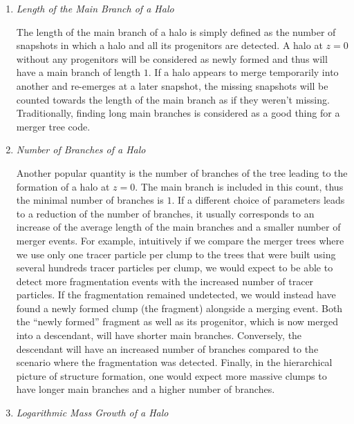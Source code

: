 \begin{enumerate}
  \setlength\itemsep{1em}
\item \emph{Length of the Main Branch of a Halo}
  
  The length of the main branch of a halo is simply defined as the
  number of snapshots in which a halo and all its progenitors are
  detected.  A halo at $z=0$ without any progenitors will be
  considered as newly formed and thus will have a main branch of
  length $1$.  If a halo appears to merge temporarily into another and
  re-emerges at a later snapshot, the missing snapshots will be
  counted towards the length of the main branch as if they weren't
  missing. Traditionally, finding long main branches is considered
  as a good thing for a merger tree code.
  
\item \emph{Number of Branches of a Halo}
  
  Another popular quantity is the number of branches of the tree
  leading to the formation of a halo at $z=0$.  The main branch is
  included in this count, thus the minimal number of branches is
  $1$. If a different choice of parameters leads to a reduction of the
  number of branches, it usually corresponds to an increase of the
  average length of the main branches and a smaller number of merger
  events. For example, intuitively if we compare the merger trees where
  we use only one tracer particle per clump to the trees that were built 
  using several hundreds tracer particles per clump, we would expect to 
  be able to detect more fragmentation events with the increased number of 
  tracer particles. If the fragmentation remained undetected, we would 
  instead have found a newly formed clump (the fragment) alongside a 
  merging event. Both the ``newly formed'' fragment as well as its
  progenitor, which is now merged into a descendant, will have shorter
  main branches. Conversely, the descendant will have an increased 
  number of branches compared to the scenario where the fragmentation
  was detected.
  Finally, in the hierarchical picture of structure formation, one
  would expect more massive clumps to have longer main branches and a
  higher number of branches.
  
\item \emph{Logarithmic Mass Growth of a Halo}
  

\end{enumerate}
